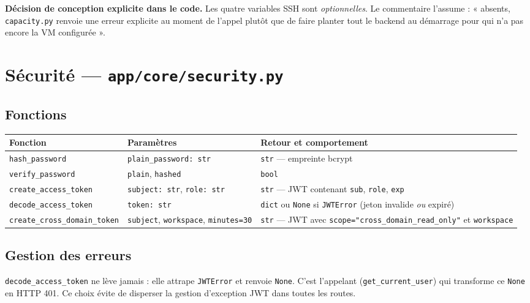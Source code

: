 \documentclass[11pt,a4paper]{report}
\newcommand{\file}[1]{\texttt{\small #1}}
\newcommand{\fn}[1]{\texttt{\small\textcolor{oasisviolet}{#1}}}
\newcommand{\cls}[1]{\texttt{\small\textcolor{oasisblue}{#1}}}
\begin{document}
\begin{keybox}
\textbf{Décision de conception explicite dans le code.} Les quatre variables
SSH sont \emph{optionnelles}. Le commentaire l'assume : « absents,
\file{capacity.py} renvoie une erreur explicite au moment de l'appel plutôt que
de faire planter tout le backend au démarrage pour qui n'a pas encore la VM
configurée ».
\end{keybox}

\section{Sécurité --- \file{app/core/security.py}}

\subsection*{Fonctions}

\begin{longtable}{@{}p{4.6cm}p{4.2cm}p{5.9cm}@{}}
\toprule
\textbf{Fonction} & \textbf{Paramètres} & \textbf{Retour et comportement}\\
\midrule
\endhead
\fn{hash\_password} & \texttt{plain\_password: str} & \texttt{str} --- empreinte bcrypt\\
\fn{verify\_password} & \texttt{plain}, \texttt{hashed} & \texttt{bool}\\
\fn{create\_access\_token} & \texttt{subject: str}, \texttt{role: str} & \texttt{str} --- JWT contenant \texttt{sub}, \texttt{role}, \texttt{exp}\\
\fn{decode\_access\_token} & \texttt{token: str} & \texttt{dict} ou \texttt{None} si \cls{JWTError} (jeton invalide \emph{ou} expiré)\\
\fn{create\_cross\_domain\_token} & \texttt{subject}, \texttt{workspace}, \texttt{minutes=30} & \texttt{str} --- JWT avec \texttt{scope="cross\_domain\_read\_only"} et \texttt{workspace}\\
\bottomrule
\end{longtable}

\subsection*{Gestion des erreurs}
\fn{decode\_access\_token} ne lève jamais : elle attrape \cls{JWTError} et
renvoie \texttt{None}. C'est l'appelant (\fn{get\_current\_user}) qui transforme
ce \texttt{None} en HTTP 401. Ce choix évite de disperser la gestion
d'exception JWT dans toutes les routes.
\end{document}
